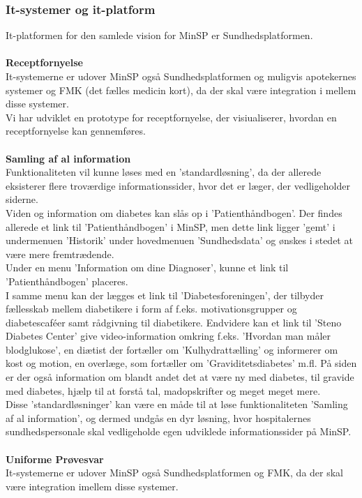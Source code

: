 \subsubsection{It-systemer og it-platform}
It-platformen for den samlede vision for MinSP er Sundhedsplatformen.
\\\\
\textbf{Receptfornyelse} \\
It-systemerne er udover MinSP også Sundhedsplatformen og muligvis apotekernes systemer og FMK (det fælles medicin kort), da der skal være integration i mellem disse systemer.\\
Vi har udviklet en prototype for receptfornyelse, der visiualiserer, hvordan en receptfornyelse kan gennemføres.
\\\\
\textbf{Samling af al information} \\
%
%
Funktionaliteten vil kunne løses med en 'standardløsning', da der allerede eksisterer flere troværdige informationssider, hvor det er læger, der vedligeholder siderne. \\
Viden og information om diabetes kan slås op i 'Patienthåndbogen'. Der findes allerede et link til 'Patienthåndbogen' i MinSP, men dette link ligger 'gemt' i undermenuen 'Historik' under hovedmenuen 'Sundhedsdata' og ønskes i stedet at være mere fremtrædende. 
\\ 
Under en menu 'Information om dine Diagnoser', kunne et link til 'Patienthåndbogen' placeres. \\
I samme menu kan der lægges et link til 'Diabetesforeningen', der tilbyder fællesskab mellem diabetikere i form af f.eks. motivationsgrupper og diabetescaféer samt rådgivning til diabetikere.
Endvidere kan et link til 'Steno Diabetes Center' give video-information omkring f.eks. 'Hvordan man måler blodglukose', en diætist der fortæller om 'Kulhydrattælling' og informerer om kost og motion, en overlæge, som fortæller om 'Graviditetsdiabetes' m.fl. 
På siden er der også information om blandt andet det at være ny med diabetes, til gravide med diabetes, hjælp til at forstå tal, madopskrifter og meget meget mere. \\
Disse 'standardløsninger' kan være en måde til at løse funktionaliteten 'Samling af al information', og dermed undgås en dyr løsning, hvor hospitalernes sundhedspersonale skal vedligeholde egen udviklede informationssider på MinSP.
\\\\
\textbf{Uniforme Prøvesvar} \\
It-systemerne er udover MinSP også Sundhedsplatformen og FMK, da der skal være integration imellem disse systemer.

